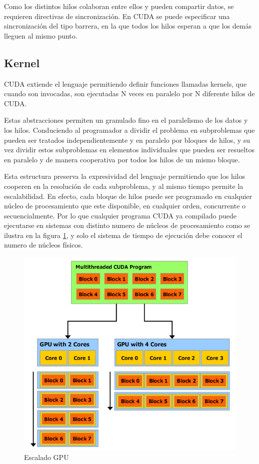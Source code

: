 \documentclass[twoside]{article}
\begin{document}
Como los distintos hilos colaboran entre ellos y pueden compartir datos, se requieren directivas de sincronización. En CUDA se puede especificar una sincronización del tipo barrera, en la que todos los hilos esperan a que los demás lleguen al mismo punto.

\subsection{Kernel}

CUDA extiende el lenguaje permitiendo definir funciones llamadas kernels, que cuando son invocadas, son ejecutadas N veces en paralelo por N diferente hilos de CUDA.

Estas abstracciones permiten un granulado fino en el paralelismo de los datos y los hilos. Conduciendo al programador a dividir el problema en subproblemas que pueden ser tratados independientemente y en paralelo por bloques de hilos, y su vez dividir estos subproblemas en elementos individuales que pueden ser resueltos en paralelo y de manera cooperativa por todos los hilos de un mismo bloque.

Esta estructura preserva la expresividad del lenguaje permitiendo que los hilos cooperen en la resolución de cada subproblema, y al mismo tiempo permite la escalabilidad. En efecto, cada bloque de hilos puede ser programado en cualquier núcleo de procesamiento que este disponible, en cualquier orden, concurrente o secuencialmente. Por lo que cualquier programa CUDA ya compilado puede ejecutarse en sistemas con distinto numero de núcleos de procesamiento como se ilustra en la figura \ref{fig:EscaladoGPU}, y solo el sistema de tiempo de ejecución debe conocer el numero de núcleos físicos.

\begin{figure}
   \begin{center}
      \includegraphics[width=.5\textwidth]{EscaladoGPU.png}
      \caption{\label{fig:EscaladoGPU} Escalado GPU}
   \end{center}
\end{figure}
\end{document}
